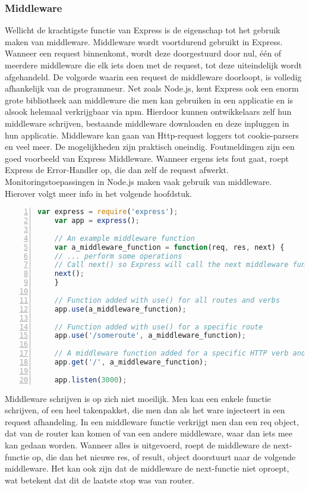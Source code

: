 \subsubsection{Middleware}
\label{sec:expressMiddleware}

Wellicht de krachtigste functie van Express is de eigenschap tot het gebruik maken van middleware. Middleware wordt voortdurend gebruikt in Express. Wanneer een request binnenkomt, wordt deze doorgestuurd door nul, één of meerdere middleware die elk iets doen met de request, tot deze uiteindelijk wordt afgehandeld. De volgorde waarin een request de middleware doorloopt, is volledig afhankelijk van de programmeur. Net zoals Node.js, kent Express ook een enorm grote bibliotheek aan middleware die men kan gebruiken in een applicatie en is alsook helemaal verkrijgbaar via npm. Hierdoor kunnen ontwikkelaars zelf hun middleware schrijven, bestaande middleware downloaden en deze inpluggen in hun applicatie. Middleware kan gaan van Http-request loggers tot cookie-parsers en veel meer. De mogelijkheden zijn praktisch oneindig. Foutmeldingen zijn een goed voorbeeld van Express Middleware. Wanneer ergens iets fout gaat, roept Express de Error-Handler op, die dan zelf de request afwerkt. Monitoringstoepassingen in Node.js maken vaak gebruik van middleware. Hierover volgt meer info in het volgende hoofdstuk.

	\begin{lstlisting}[language=JavaScript, breaklines=true,
						numbers=left, frame=single,
						caption={Express code flow voorbeeld.},
						label=code:expressexample]
	var express = require('express');
	var app = express();
	
	// An example middleware function
	var a_middleware_function = function(req, res, next) {
	// ... perform some operations
	// Call next() so Express will call the next middleware function in the chain.
	next();
	}
	
	// Function added with use() for all routes and verbs
	app.use(a_middleware_function);
	
	// Function added with use() for a specific route
	app.use('/someroute', a_middleware_function);
	
	// A middleware function added for a specific HTTP verb and route
	app.get('/', a_middleware_function);
	
	app.listen(3000);
	\end{lstlisting}
	
	
Middleware schrijven is op zich niet moeilijk. Men kan een enkele functie schrijven, of een heel takenpakket, die men dan als het ware injecteert in een request afhandeling. In een middleware functie verkrijgt men dan een req object, dat van de router kan komen of van een andere middleware, waar dan iets mee kan gedaan worden. Wanneer alles is uitgevoerd, roept de middleware de next-functie op, die dan het nieuwe res, of result, object doorstuurt naar de volgende middleware. Het kan ook zijn dat de middleware de next-functie niet oproept, wat betekent dat dit de laatste stop was van router. 

